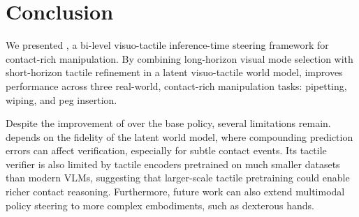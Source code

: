 \section{Conclusion}
\label{sec:conclusion}

We presented \ours, a bi-level visuo-tactile inference-time steering framework for contact-rich manipulation. By combining long-horizon visual mode selection with short-horizon tactile refinement in a latent visuo-tactile world model, \ours improves performance across three real-world, contact-rich manipulation tasks: pipetting, wiping, and peg insertion.

 Despite the improvement of \ours over the base policy, several limitations remain. \ours depends on the fidelity of the latent world model, where compounding prediction errors can affect verification, especially for subtle contact events. Its tactile verifier is also limited by tactile encoders pretrained on much smaller datasets than modern VLMs, suggesting that larger-scale tactile pretraining could enable richer contact reasoning. Furthermore, future work can also extend multimodal policy steering to more complex embodiments, such as dexterous hands. 





